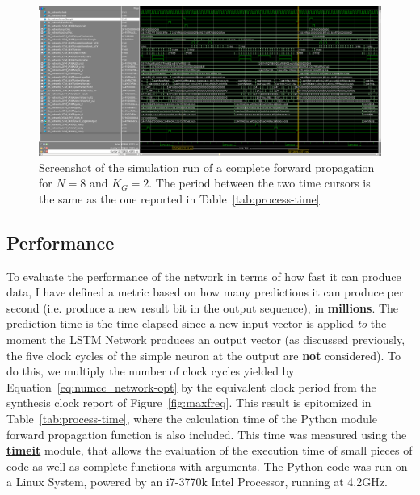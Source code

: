 \begin{figure}
    \centering
    \includegraphics[width=\linewidth]{figures/wave.png}
    \caption[Screenshot of the simulation run of a complete forward propagation for $N=8$ and $K_G=2$]{Screenshot of the simulation run of a complete forward propagation for $N=8$ and $K_G=2$. The period between the two time cursors is the same as the one reported in Table~\ref{tab:process-time}}
    \label{fig:res-meth-wave}
\end{figure}
\subsection{Performance}\label{sec:res-valid-fpps}
To evaluate the performance of the network in terms of how fast it can produce data, I have defined a metric based on how many predictions it can produce per second (i.e. produce a new result bit in the output sequence), in \textbf{millions}. The prediction time is the time elapsed since a new input vector is applied \emph{to} the moment the LSTM Network produces an output vector (as discussed previously, the five clock cycles of the simple neuron at the output are \textbf{not} considered). To do this, we multiply the number of clock cycles yielded by Equation~\ref{eq:numcc_network-opt} by the equivalent clock period from the synthesis clock report of Figure~\ref{fig:maxfreq}. This result is epitomized in Table~\ref{tab:process-time}, where the calculation time of the Python module forward propagation function is also included. This time was measured using the \href{https://docs.python.org/3.5/library/timeit.html}{\textbf{timeit}} module, that allows the evaluation of the execution time of small pieces of code as well as complete functions with arguments. The Python code was run on a Linux System, powered by an i7-3770k Intel Processor, running at 4.2GHz.

